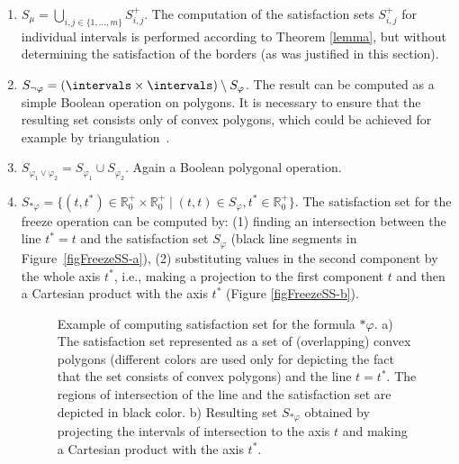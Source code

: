 \begin{enumerate}


	\item $S_{\mu} = \bigcup_{i, j \in\{1,...,m\}} S^+_{i,j}$. The computation of the satisfaction sets $S^+_{i,j}$ for individual intervals is performed according to Theorem \ref{lemma}, but without determining the satisfaction of the borders (as was justified in this section).

	\item $S_{\neg \varphi} = (\intervals \times \intervals) \setminus S_{\varphi}$. The result can be computed as a simple Boolean operation on polygons. It is necessary to ensure that the resulting set consists only of convex polygons, which could be achieved for example by triangulation~\cite{GeometricAlgorithms}. 
	
	\item $S_{\varphi_1 \vee \varphi_2} = S_{\varphi_1} \cup S_{\varphi_2}$. Again a Boolean polygonal operation. 

	\item $S_{\ast \varphi} = \lbrace (t, t^\ast) \in \mathbb{R}_0^+ \times \mathbb{R}_0^+ \mid (t, t) \in S_{\varphi}, t^\ast \in \mathbb{R}_0^+ \rbrace$. The satisfaction set for the freeze operation can be computed by: (1) finding an intersection between the line $t^* = t$ and the satisfaction set $S_{\varphi}$ (black line segments in Figure~\ref{figFreezeSS-a}), (2) substituting values in the second component by the whole axis $t^\ast$, i.e., making a projection to the first component $t$ and then a Cartesian product with the axis $t^\ast$ (Figure \ref{figFreezeSS-b}).  
	
	
	
\begin{figure}[h]
   \centering  
    	
      	\caption{Example of computing satisfaction set for the formula $\ast \varphi$. a) The satisfaction set represented as a set of (overlapping) convex polygons (different colors are used only for depicting the fact that the set consists of convex polygons) and the line $t = t^\ast$. The regions of intersection of the line and the satisfaction set are depicted in black color. b) Resulting set $S_{\ast \varphi}$ obtained by projecting the intervals of intersection to the axis $t$ and making a Cartesian product with the axis $t^\ast$.}
	\label{figFreezeSS}    
    

\end{figure}
\end{enumerate}
